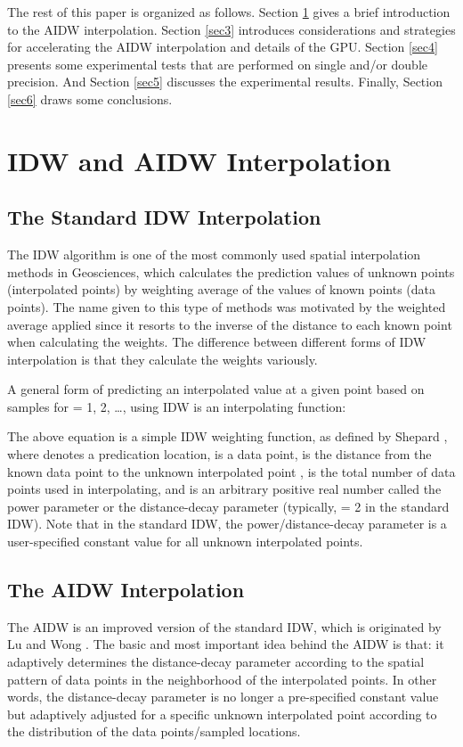 \documentclass[fleqn,11pt]{wlscirep}
\begin{document}
The rest of this paper is organized as follows. Section \ref{sec2} gives a brief 
introduction to the AIDW interpolation. Section \ref{sec3} introduces considerations 
and strategies for accelerating the AIDW interpolation and details of the 
GPU. Section \ref{sec4} presents some experimental tests that are performed on single 
and/or double precision. And Section \ref{sec5} discusses the experimental results. 
Finally, Section \ref{sec6} draws some conclusions.

\section{IDW and AIDW Interpolation }\label{sec2}
\subsection{The Standard IDW Interpolation}
The IDW algorithm is one of the most commonly used spatial interpolation 
methods in Geosciences, which calculates the prediction values of unknown 
points (interpolated points) by weighting average of the values of known 
points (data points). The name given to this type of methods was motivated 
by the weighted average applied since it resorts to the inverse of the 
distance to each known point when calculating the weights. The difference 
between different forms of IDW interpolation is that they calculate the 
weights variously. 

A general form of predicting an interpolated value  at a given point  based 
on samples  for  = 1, 2, {\ldots},  using IDW is an 
interpolating function: 


The above equation is a simple IDW weighting function, as defined by Shepard \cite{01}, where  denotes a predication location,  is a data 
point,  is the distance from the known data point  to the unknown 
interpolated point ,  is the total number of data points used in 
interpolating, and  is an arbitrary positive real number called the power 
parameter or the distance-decay parameter (typically,  = 2 in the 
standard IDW). Note that in the standard IDW, the power/distance-decay 
parameter  is a user-specified constant value for all unknown 
interpolated points. 

\subsection{The AIDW Interpolation}
The AIDW is an improved version of the standard IDW, which is originated by 
Lu and Wong \cite{32}. The basic and most important idea 
behind the AIDW is that: it adaptively determines the distance-decay 
parameter  according to the spatial pattern of data points in the 
neighborhood of the interpolated points. In other words, the distance-decay 
parameter  is no longer a pre-specified constant value but 
adaptively adjusted for a specific unknown interpolated point according to 
the distribution of the data points/sampled locations.
\end{document}
